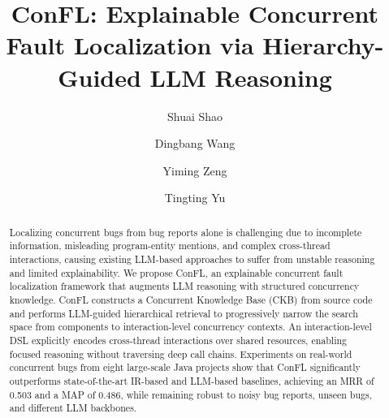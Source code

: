 \documentclass[acmsmall]{acmart}
\begin{document}


\title{ConFL: Explainable Concurrent Fault Localization via Hierarchy-Guided LLM Reasoning}

\author{Shuai Shao}

\author{Dingbang Wang}

\author{Yiming Zeng}

\author{Tingting Yu}
\renewcommand{\shortauthors}{Shuai Shao, Dingbang Wang, Yiming Zeng, and Tingting Yu}
\begin{abstract}
Localizing concurrent bugs from bug reports alone is challenging due to incomplete information, misleading program-entity mentions, and complex cross-thread interactions, causing existing LLM-based approaches to suffer from unstable reasoning and limited explainability. We propose ConFL, an explainable concurrent fault localization framework that augments LLM reasoning with structured concurrency knowledge. ConFL constructs a Concurrent Knowledge Base (CKB) from source code and performs LLM-guided hierarchical retrieval to progressively narrow the search space from components to interaction-level concurrency contexts. An interaction-level DSL explicitly encodes cross-thread interactions over shared resources, enabling focused reasoning without traversing deep call chains. Experiments on real-world concurrent bugs from eight large-scale Java projects show that ConFL significantly outperforms state-of-the-art IR-based and LLM-based baselines, achieving an MRR of 0.503 and a MAP of 0.486, while remaining robust to noisy bug reports, unseen bugs, and different LLM backbones.
\end{abstract}
\end{document}
